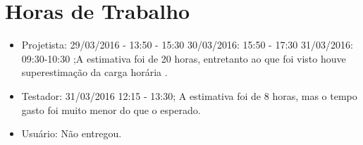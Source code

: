 \documentclass[12pt,a4paper,final]{report}
\begin{document}
\section*{Horas de Trabalho}
\begin{itemize}
\item Projetista: 29/03/2016 - 13:50 - 15:30
30/03/2016: 15:50 - 17:30 
31/03/2016: 09:30-10:30 ;A estimativa foi de 20 horas, entretanto ao que foi visto houve superestimação da carga horária .
\item Testador: 31/03/2016 12:15 - 13:30; A estimativa foi de 8 horas, mas o tempo gasto foi muito menor do que o esperado.  

\item Usuário: Não entregou.
\end{itemize}
\end{document}
